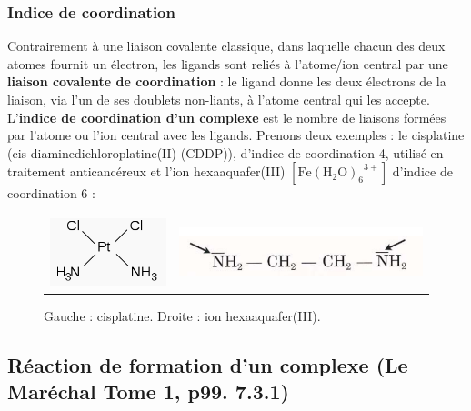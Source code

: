 \documentclass[11pt,a4paper]{report}
\begin{document}
\subsubsection*{Indice de coordination}

Contrairement à une liaison covalente classique, dans laquelle chacun des deux atomes fournit un électron, les ligands sont reliés à l'atome/ion central par une \textbf{liaison covalente de coordination} : le ligand donne les deux électrons de la liaison, via l'un de ses doublets non-liants, à l'atome central qui les accepte.\\

L'\textbf{indice de coordination d'un complexe} est le nombre de liaisons formées par l'atome ou l'ion central avec les ligands. Prenons deux exemples : le cisplatine (cis-diaminedichloroplatine(II) (CDDP)), d'indice de coordination 4, utilisé en traitement anticancéreux  et l'ion hexaaquafer(III) $[{\text{Fe}(\text{H}_2\text{O})_6}^{3+}]$ d'indice de coordination 6 :

\begin{figure}[h!]
	\begin{center}
		\begin{tabular}{cc}
  		\includegraphics[scale = 0.4]{cisplatine.png} &
   		\includegraphics[scale = 0.4]{ethylenediamine.png}\\
	\end{tabular}
	\caption{Gauche : cisplatine. Droite : ion hexaaquafer(III).}
	\end{center}
\end{figure}

\subsection{Réaction de formation d'un complexe (Le Maréchal Tome 1, p99. 7.3.1)}
\end{document}
